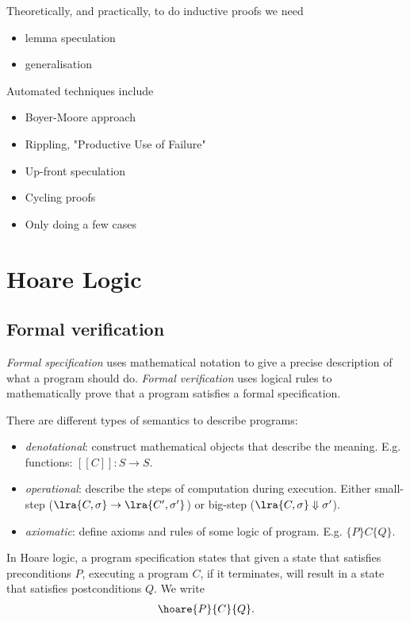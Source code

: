 \documentclass{article}
\begin{document}
Theoretically, and practically, to do inductive proofs we need
\begin{itemize}
	\item lemma speculation
	\item generalisation
\end{itemize}

Automated techniques include
\begin{itemize}
	\item Boyer-Moore approach
	\item Rippling, "Productive Use of Failure"
	\item Up-front speculation
	\item Cycling proofs
	\item Only doing a few cases
\end{itemize}

\section{Hoare Logic}

\subsection{Formal verification}

\begin{definition}
	\emph{Formal specification} uses mathematical notation to give a precise description
	of what a program should do. \emph{Formal verification} uses logical rules to mathematically
	prove that a program satisfies a formal specification.

	There are different types of semantics to describe programs:
	\begin{itemize}
		\item \emph{denotational}: construct mathematical objects that describe the meaning.
		      E.g. functions: $[\![C]\!]:S\to S$.
		\item \emph{operational}: describe the steps of computation during execution. Either
		      small-step ($\lra{C,\sigma}\to\lra{C',\sigma'}$) or big-step ($\lra{C,\sigma}\Downarrow\sigma'$).
		\item \emph{axiomatic}: define axioms and rules of some logic of program. E.g. $\{P\}C\{Q\}$.
	\end{itemize}
\end{definition}

\begin{definition}
	In Hoare logic, a program specification states that
	given a state that satisfies preconditions $P$, executing a program $C$, if it terminates,
	will result in a state that satisfies postconditions $Q$. We write
	\begin{align*}
		\hoare{P}{C}{Q}.
	\end{align*}
\end{definition}
\end{document}
